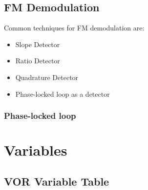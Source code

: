 \documentclass[12pt]{article}
\begin{document}
\subsection{FM Demodulation}%
Common techniques for FM demodulation are:
\begin{itemize}
    \item Slope Detector
    \item Ratio Detector
    \item Quadrature Detector
    \item Phase-locked loop as a detector
\end{itemize}

\subsubsection{Phase-locked loop}

\newpage
\section{Variables} %
\subsection{VOR Variable Table}%
\end{document}
